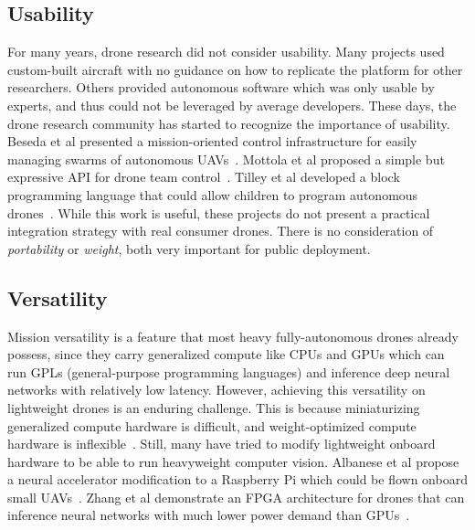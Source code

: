 \subsection{Usability}
\label{sec:development-platforms}
For many years, drone research did not consider usability. Many projects used custom-built aircraft with no guidance on how to replicate the platform for other researchers. Others provided autonomous software which was only usable by experts, and thus could not be leveraged by average developers. These days, the drone research community has started to recognize the importance of usability. Beseda et al presented a mission-oriented control infrastructure for easily managing swarms of autonomous UAVs~\cite{Besada2019}. Mottola et al proposed a simple but expressive API for drone team control~\cite{Mottola2014}. Tilley et al developed a block programming language that could allow children to program autonomous drones~\cite{Tilley2017}. While this work is useful, these projects do not present a practical integration strategy with real consumer drones. There is no consideration of \textit{portability} or \textit{weight}, both very important for public deployment.

\subsection{Versatility}
Mission versatility is a feature that most heavy fully-autonomous drones already possess, since they carry generalized compute like CPUs and GPUs which can run GPLs (general-purpose programming languages) and inference deep neural networks with relatively low latency. However, achieving this versatility on lightweight drones is an enduring challenge. This is because miniaturizing generalized compute hardware is difficult, and weight-optimized compute hardware is inflexible~\cite{Hu2022}. Still, many have tried to modify lightweight onboard hardware to be able to run heavyweight computer vision. Albanese et al propose a neural accelerator modification to a Raspberry Pi which could be flown onboard small UAVs~\cite{Albanese2022}. Zhang et al demonstrate an FPGA architecture for drones that can inference neural networks with much lower power demand than GPUs~\cite{Zhang2022}.


